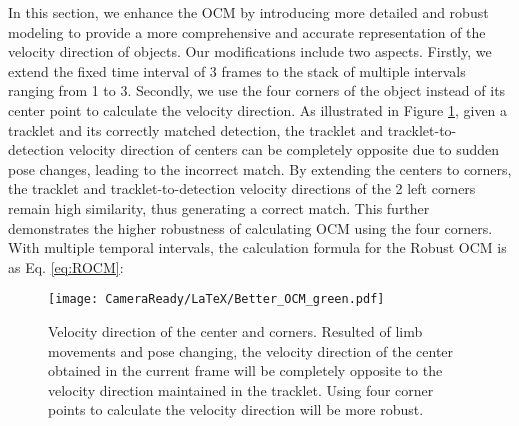 \documentclass[letterpaper]{article} \usepackage{aaai23}  \usepackage{times}  \usepackage{helvet}  \usepackage{courier}  \usepackage[hyphens]{url}  \usepackage{graphicx} \urlstyle{rm} \def\UrlFont{\rm}  \usepackage{natbib}  \usepackage{caption} \frenchspacing  \setlength{\pdfpagewidth}{8.5in}  \setlength{\pdfpageheight}{11in}  \usepackage{algorithm}
\begin{document}
In this section, we enhance the OCM by introducing more detailed and robust modeling to provide a more comprehensive and accurate representation of the velocity direction of objects. Our modifications include two aspects. Firstly, we extend the fixed time interval of 3 frames to the stack of multiple intervals ranging from 1 to 3. Secondly, we use the four corners of the object instead of its center point to calculate the velocity direction. As illustrated in Figure \ref{Better_OCM}, given a tracklet and its correctly matched detection, the tracklet and tracklet-to-detection velocity direction of centers can be completely opposite due to sudden pose changes, leading to the incorrect match. By extending the centers to corners, the tracklet and tracklet-to-detection velocity directions of the 2 left corners remain high similarity, thus generating a correct match. This further demonstrates the higher robustness of calculating OCM using the four corners. With multiple temporal intervals, the calculation formula for the Robust OCM is as Eq. \ref{eq:ROCM}:




\begin{figure}[t]
\centering
\texttt{[image: CameraReady/LaTeX/Better\_OCM\_green.pdf]} \caption{Velocity direction of the center and corners. Resulted of limb movements and pose changing, the velocity direction of the center obtained in the current frame will be completely opposite to the velocity direction maintained in the tracklet. Using four corner points to calculate the velocity direction will be more robust.}
\label{Better_OCM}
\end{figure}
\end{document}
